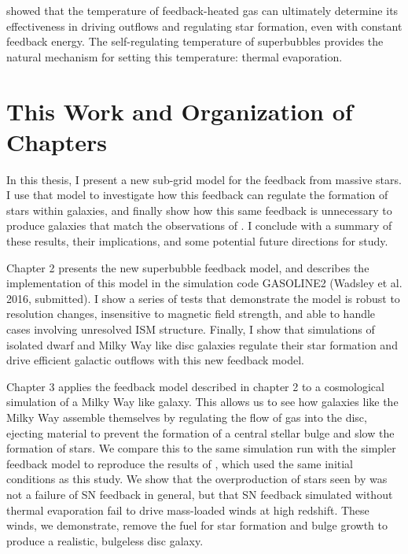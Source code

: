 \citet{DallaVecchia2012} showed that the temperature of feedback-heated gas can
ultimately determine its effectiveness in driving outflows and regulating star
formation, even with constant feedback energy.  The self-regulating temperature
of superbubbles provides the natural mechanism for setting this temperature:
thermal evaporation.

\section{This Work and Organization of Chapters}
In this thesis, I present a new sub-grid model for the feedback from massive
stars.  I use that model to investigate how this feedback can regulate the
formation of stars within galaxies, and finally show how this same feedback is
unnecessary to produce galaxies that match the observations of
\citet{McGaugh2016}.  I conclude with a summary of these results, their
implications, and some potential future directions for study.

Chapter 2 presents the new superbubble feedback model, and describes the
implementation of this model in the simulation code {\sc GASOLINE2} (Wadsley et
al. 2016, submitted).  I show a series of tests that demonstrate the model is
robust to resolution changes, insensitive to magnetic field strength, and able
to handle cases involving unresolved ISM structure.  Finally, I show that
simulations of isolated dwarf and Milky Way like disc galaxies regulate their
star formation and drive efficient galactic outflows with this new feedback
model.

Chapter 3 applies the feedback model described in chapter 2 to a cosmological
simulation of a Milky Way like galaxy.  This allows us to see how galaxies like
the Milky Way assemble themselves by regulating the flow of gas into the disc,
ejecting material to prevent the formation of a central stellar bulge and slow
the formation of stars.  We compare this to the same simulation run with the
simpler \citet{Stinson2006} feedback model to reproduce the results of
\citet{Stinson2010}, which used the same initial conditions as this study.  We
show that the overproduction of stars seen by \citet{Stinson2010} was not a
failure of SN feedback in general, but that SN feedback simulated without 
thermal evaporation fail to drive mass-loaded winds at high redshift.  These
winds, we demonstrate, remove the fuel for star formation and bulge growth to
produce a realistic, bulgeless disc galaxy.

